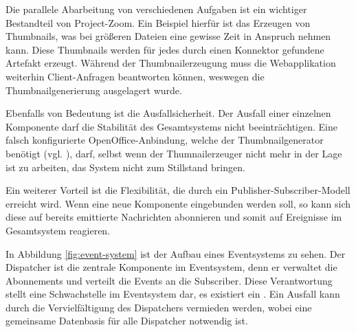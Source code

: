 Die parallele Abarbeitung von verschiedenen Aufgaben ist ein wichtiger Bestandteil von Project-Zoom. Ein Beispiel hierfür ist das Erzeugen von \gls{Thumbnail}s, was bei größeren Dateien eine gewisse Zeit in Anspruch nehmen kann. Diese \gls{Thumbnail}s werden für jedes durch einen Konnektor gefundene \gls{Artefakt} erzeugt. Während der \gls{Thumbnail}erzeugung muss die Webapplikation weiterhin Client-Anfragen beantworten können, weswegen die \gls{Thumbnail}generierung ausgelagert wurde.

Ebenfalls von Bedeutung ist die Ausfallsicherheit. Der Ausfall einer einzelnen Komponente darf die Stabilität des Gesamtsystems nicht beeinträchtigen. Eine falsch konfigurierte OpenOffice-Anbindung, welche der \gls{Thumbnail}generator benötigt (vgl. \cite{bp-dome}), darf, selbst wenn der Thumnailerzeuger nicht mehr in der Lage ist zu arbeiten, das System nicht zum Stillstand bringen.

Ein weiterer Vorteil ist die Flexibilität, die durch ein Publisher-Subscriber-Modell erreicht wird. Wenn eine neue Komponente eingebunden werden soll, so kann sich diese auf bereits emittierte Nachrichten abonnieren und somit auf Ereignisse im Gesamtsystem reagieren.

In Abbildung \ref{fig:event-system} ist der Aufbau eines \gls{Eventsystem}s zu sehen. Der Dispatcher ist die zentrale Komponente im \gls{Eventsystem}, denn er verwaltet die Abonnements und verteilt die Events an die Subscriber. Diese Verantwortung stellt eine Schwachstelle im \gls{Eventsystem} dar, es existiert ein . Ein Ausfall kann durch die Vervielfältigung des Dispatchers vermieden werden, wobei eine gemeinsame Datenbasis für alle Dispatcher notwendig ist. 
